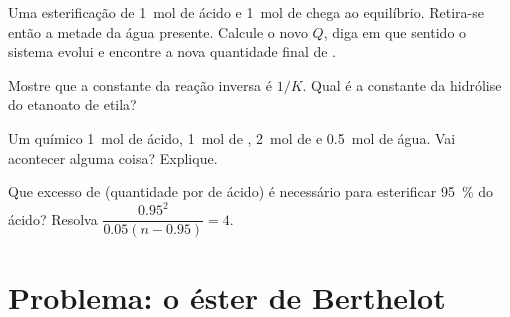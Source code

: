 \begin{exercise}[$\star\star\star$]\label{exo:g12:equilibrium:12}
Uma esterificação de \qty{1}{mol} de ácido e \qty{1}{mol} de 
chega ao equilíbrio. Retira-se então a metade da água presente. Calcule
o novo $Q$, diga em que sentido o sistema evolui e encontre a nova
quantidade final de .
\end{exercise}

\begin{exercise}[$\star\star\star$]\label{exo:g12:equilibrium:13}
Mostre que a constante da reação inversa é $1/K$. Qual é a constante da
hidrólise do etanoato de etila?
\end{exercise}

\begin{exercise}[$\star\star\star$]\label{exo:g12:equilibrium:14}
Um químico  \qty{1}{mol} de ácido, \qty{1}{mol} de ,
\qty{2}{mol} de  e \qty{0.5}{mol} de água. Vai acontecer alguma
coisa? Explique.
\end{exercise}

\begin{exercise}[$\star\star\star$]\label{exo:g12:equilibrium:15}
Que excesso de  (quantidade por  de ácido) é necessário para
esterificar \qty{95}{\percent} do ácido? Resolva $\dfrac{0.95^2}{0.05(n - 0.95)} =
4$.
\end{exercise}

\section{Problema: o éster de Berthelot}

